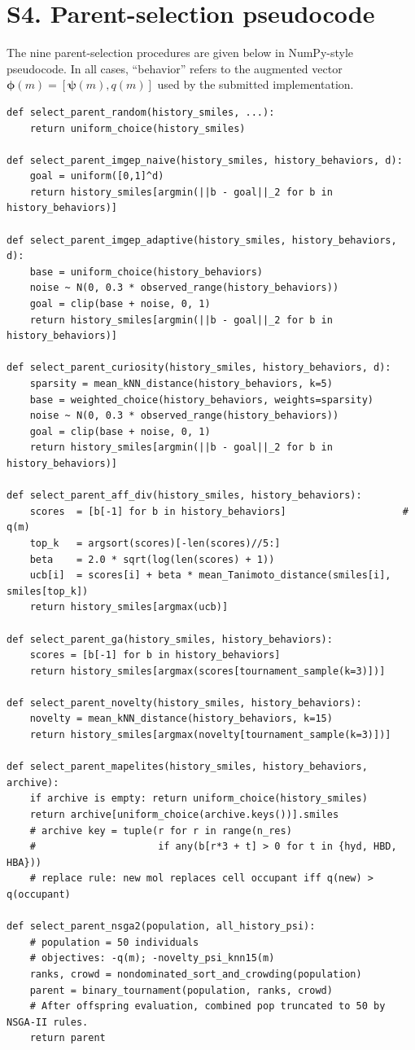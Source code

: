 \documentclass[journal=jcisd8,manuscript=suppinfo]{achemso}
\begin{document}
\section*{S4. Parent-selection pseudocode}

The nine parent-selection procedures are given below in NumPy-style pseudocode. In all cases, ``behavior'' refers to the augmented vector $\boldsymbol{\phi}(m) = [\boldsymbol{\psi}(m), q(m)]$ used by the submitted implementation.

{\small
\begin{verbatim}
def select_parent_random(history_smiles, ...):
    return uniform_choice(history_smiles)

def select_parent_imgep_naive(history_smiles, history_behaviors, d):
    goal = uniform([0,1]^d)
    return history_smiles[argmin(||b - goal||_2 for b in history_behaviors)]

def select_parent_imgep_adaptive(history_smiles, history_behaviors, d):
    base = uniform_choice(history_behaviors)
    noise ~ N(0, 0.3 * observed_range(history_behaviors))
    goal = clip(base + noise, 0, 1)
    return history_smiles[argmin(||b - goal||_2 for b in history_behaviors)]

def select_parent_curiosity(history_smiles, history_behaviors, d):
    sparsity = mean_kNN_distance(history_behaviors, k=5)
    base = weighted_choice(history_behaviors, weights=sparsity)
    noise ~ N(0, 0.3 * observed_range(history_behaviors))
    goal = clip(base + noise, 0, 1)
    return history_smiles[argmin(||b - goal||_2 for b in history_behaviors)]

def select_parent_aff_div(history_smiles, history_behaviors):
    scores  = [b[-1] for b in history_behaviors]                    # q(m)
    top_k   = argsort(scores)[-len(scores)//5:]
    beta    = 2.0 * sqrt(log(len(scores) + 1))
    ucb[i]  = scores[i] + beta * mean_Tanimoto_distance(smiles[i], smiles[top_k])
    return history_smiles[argmax(ucb)]

def select_parent_ga(history_smiles, history_behaviors):
    scores = [b[-1] for b in history_behaviors]
    return history_smiles[argmax(scores[tournament_sample(k=3)])]

def select_parent_novelty(history_smiles, history_behaviors):
    novelty = mean_kNN_distance(history_behaviors, k=15)
    return history_smiles[argmax(novelty[tournament_sample(k=3)])]

def select_parent_mapelites(history_smiles, history_behaviors, archive):
    if archive is empty: return uniform_choice(history_smiles)
    return archive[uniform_choice(archive.keys())].smiles
    # archive key = tuple(r for r in range(n_res)
    #                     if any(b[r*3 + t] > 0 for t in {hyd, HBD, HBA}))
    # replace rule: new mol replaces cell occupant iff q(new) > q(occupant)

def select_parent_nsga2(population, all_history_psi):
    # population = 50 individuals
    # objectives: -q(m); -novelty_psi_knn15(m)
    ranks, crowd = nondominated_sort_and_crowding(population)
    parent = binary_tournament(population, ranks, crowd)
    # After offspring evaluation, combined pop truncated to 50 by NSGA-II rules.
    return parent
\end{verbatim}
}
\end{document}
